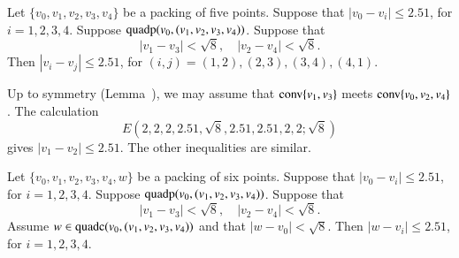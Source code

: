\begin{tarskidata}
\begin{tarski}

\begin{lemma}  
Let $\{v_0,v_1,v_2,v_3,v_4\}$ be a packing of five points.
Suppose that $|v_0-v_i|\le 2.51$, for $i=1,2,3,4$.
Suppose ${\operatorname{quadp}}(v_0,(v_1,v_2,v_3,v_4))$.
Suppose that
  $$|v_1-v_3|<\sqrt8,\quad |v_2-v_4| <\sqrt8.$$
Then $|v_i-v_j|\le 2.51$, for $(i,j)=(1,2),(2,3),(3,4),(4,1)$.
\end{lemma}


\begin{proved}
Up to symmetry (Lemma~), we may assume
that ${\operatorname{conv}}\{v_1,v_3\}$ meets ${\operatorname{conv}}\{v_0,v_2,v_4\}$.
The calculation
   $$
   E(2,2,2,2.51,\sqrt8,2.51,2.51,2,2; \sqrt8)
   $$
gives $|v_1-v_2|\le 2.51$. The other inequalities are similar.
\swallowed\end{proved}
\end{tarski}





\begin{tarski}

\begin{lemma} 
Let $\{v_0,v_1,v_2,v_3,v_4,w\}$ be a packing of six points.
Suppose that $|v_0-v_i|\le 2.51$, for $i=1,2,3,4$.
Suppose ${\operatorname{quadp}}(v_0,(v_1,v_2,v_3,v_4))$.
Suppose that
  $$|v_1-v_3|<\sqrt8,\quad |v_2-v_4| <\sqrt8.$$
Assume $w\in{\operatorname{quadc}}(v_0,(v_1,v_2,v_3,v_4))$ and that $|w-v_0|<\sqrt8$.
Then $|w-v_i|\le 2.51$, for $i=1,2,3,4$.
\end{lemma}



\end{tarski}
\end{tarskidata}
